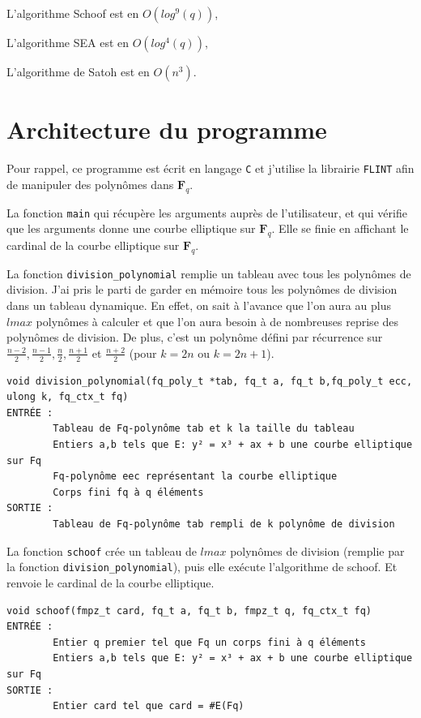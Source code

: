 \documentclass{article}%
\theoremstyle{plain}
\theoremstyle{definition}
\theoremstyle{plain}
\theoremstyle{plain}
\theoremstyle{remark}
\newcommand\fq{\mathbf{F}_{q}}
\begin{document}
\begin{list}{•}{}
\item L'algorithme Schoof est en $O(log^{9}(q))$,
\item L'algorithme SEA est en $O(log^{4}(q))$,
\item L'algorithme de Satoh est en $O(n^{3})$.
\end{list}



\section{Architecture du programme}

Pour rappel, ce programme est écrit en langage \verb|C| et j'utilise la librairie \verb|FLINT| afin de manipuler des polynômes dans $\fq$.
\begin{list}{•}{J'ai choisi de décomposer mon programme en trois parties :}
\item La fonction  \verb|main| qui récupère les arguments auprès de l'utilisateur, et qui vérifie que les arguments donne une courbe elliptique sur $\fq$.
Elle se finie en affichant le cardinal de la courbe elliptique sur $\fq$.
\item La fonction \verb|division_polynomial| remplie un tableau avec tous les polynômes de division.
J'ai pris le parti de garder en mémoire tous les polynômes de division dans un tableau dynamique.
En effet, on sait à l'avance que l'on aura au plus $lmax$ polynômes à calculer et que l'on aura besoin à de nombreuses reprise des polynômes de division.
De plus, c'est un polynôme défini par récurrence sur $\frac{n-2}{2}, \frac{n-1}{2},\frac{n}{2},\frac{n+1}{2}$ et $\frac{n+2}{2}$ (pour $k=2n$ ou $k=2n+1$).


\begin{verbatim}
void division_polynomial(fq_poly_t *tab, fq_t a, fq_t b,fq_poly_t ecc,
ulong k, fq_ctx_t fq)
ENTRÉE :
    	Tableau de Fq-polynôme tab et k la taille du tableau
    	Entiers a,b tels que E: y² = x³ + ax + b une courbe elliptique sur Fq
    	Fq-polynôme eec représentant la courbe elliptique
    	Corps fini fq à q éléments
SORTIE :
    	Tableau de Fq-polynôme tab rempli de k polynôme de division
\end{verbatim} 
\item La fonction \verb|schoof| crée un tableau de $lmax$ polynômes de division (remplie par la fonction \verb|division_polynomial|), puis elle exécute l'algorithme de schoof. Et renvoie le cardinal de la courbe elliptique.
\begin{verbatim}
void schoof(fmpz_t card, fq_t a, fq_t b, fmpz_t q, fq_ctx_t fq)
ENTRÉE :
    	Entier q premier tel que Fq un corps fini à q éléments
    	Entiers a,b tels que E: y² = x³ + ax + b une courbe elliptique sur Fq
SORTIE :
    	Entier card tel que card = #E(Fq)
\end{verbatim} 
\end{list}
\end{document}
